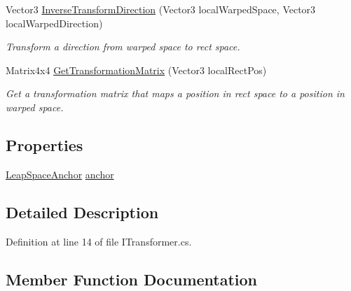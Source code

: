 \begin{DoxyCompactItemize}
Vector3 \mbox{\hyperlink{interface_leap_1_1_unity_1_1_space_1_1_i_transformer_aa555a28ab51ed506732bb88756f06168}{Inverse\+Transform\+Direction}} (Vector3 local\+Warped\+Space, Vector3 local\+Warped\+Direction)
\begin{DoxyCompactList}\small\item\em Transform a direction from warped space to rect space. \end{DoxyCompactList}\item 
Matrix4x4 \mbox{\hyperlink{interface_leap_1_1_unity_1_1_space_1_1_i_transformer_a151be0f514da2568b75177fdb31724b3}{Get\+Transformation\+Matrix}} (Vector3 local\+Rect\+Pos)
\begin{DoxyCompactList}\small\item\em Get a transformation matrix that maps a position in rect space to a position in warped space. \end{DoxyCompactList}\end{DoxyCompactItemize}
\subsection*{Properties}
\begin{DoxyCompactItemize}
\item 
\mbox{\hyperlink{class_leap_1_1_unity_1_1_space_1_1_leap_space_anchor}{Leap\+Space\+Anchor}} \mbox{\hyperlink{interface_leap_1_1_unity_1_1_space_1_1_i_transformer_a95fc8ef0dbdc20ff39b82db2575fc10b}{anchor}}
\end{DoxyCompactItemize}


\subsection{Detailed Description}


Definition at line 14 of file I\+Transformer.\+cs.



\subsection{Member Function Documentation}
\mbox{\label{interface_leap_1_1_unity_1_1_space_1_1_i_transformer_a151be0f514da2568b75177fdb31724b3}} 
